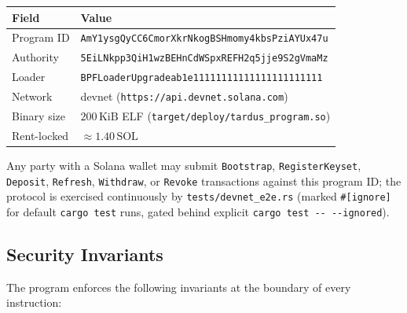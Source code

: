 \begin{center}
\small
\begin{tabular}{ll}
\toprule
Field & Value \\
\midrule
Program ID            & \texttt{AmY1ysgQyCC6CmorXkrNkogBSHmomy4kbsPziAYUx47u} \\
Authority             & \texttt{5EiLNkpp3QiH1wzBEHnCdWSpxREFH2q5jje9S2gVmaMz} \\
Loader                & \texttt{BPFLoaderUpgradeab1e11111111111111111111111}    \\
Network               & devnet (\texttt{https://api.devnet.solana.com}) \\
Binary size           & $200\,\mathrm{KiB}$ ELF (\texttt{target/deploy/tardus\_program.so}) \\
Rent-locked           & $\approx 1.40\,\mathrm{SOL}$                                \\
\bottomrule
\end{tabular}
\end{center}

Any party with a Solana wallet may submit \texttt{Bootstrap},
\texttt{RegisterKeyset}, \texttt{Deposit}, \texttt{Refresh},
\texttt{Withdraw}, or \texttt{Revoke} transactions against this
program ID; the protocol is exercised continuously by
\texttt{tests/devnet\_e2e.rs} (marked \texttt{\#[ignore]} for default
\texttt{cargo test} runs, gated behind explicit \texttt{cargo test
-{}- -{}-ignored}).

\subsection{Security Invariants}
\label{sec:onchain-security}

The program enforces the following invariants at the boundary of every instruction:

